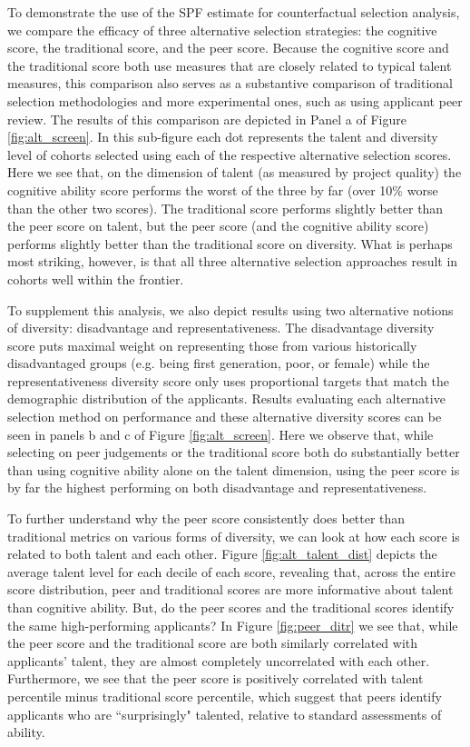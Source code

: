 To demonstrate the use of the SPF estimate for counterfactual selection analysis, we compare the efficacy of three alternative selection strategies: the cognitive score, the traditional score, and the peer score. Because the cognitive score and the traditional score both use measures that are closely related to typical talent measures, this comparison also serves as a substantive comparison of traditional selection methodologies and more experimental ones, such as using applicant peer review. The results of this comparison are depicted in Panel a of Figure \ref{fig:alt_screen}. In this sub-figure each dot represents the talent and diversity level of cohorts selected using each of the respective alternative selection scores. Here we see that, on the dimension of talent (as measured by project quality) the cognitive ability score performs the worst of the three by far (over 10\% worse than the other two scores). The traditional score performs slightly better than the peer score on talent, but the peer score (and the cognitive ability score) performs slightly better than the traditional score on diversity. What is perhaps most striking, however, is that all three alternative selection approaches result in cohorts well within the frontier.

To supplement this analysis, we also depict results using two alternative notions of diversity: disadvantage and representativeness. The disadvantage diversity score puts maximal weight on representing those from various historically disadvantaged groups (e.g. being first generation, poor, or female) while the representativeness diversity score only uses proportional targets that match the demographic distribution of the applicants. Results evaluating each alternative selection method on performance and these alternative diversity scores can be seen in panels b and c of Figure \ref{fig:alt_screen}. Here we observe that, while selecting on peer judgements or the traditional score both do substantially better than using cognitive ability alone on the talent dimension, using the peer score is by far the highest performing on both disadvantage and representativeness.

To further understand why the peer score consistently does better than traditional metrics on various forms of diversity, we can look at how each score is related to both talent and each other. Figure \ref{fig:alt_talent_dist} depicts the average talent level for each decile of each score, revealing that, across the entire score distribution, peer and traditional scores are more informative about talent than cognitive ability. But, do the peer scores and the traditional scores identify the same high-performing applicants? In Figure \ref{fig:peer_ditr} we see that, while the peer score and the traditional score are both similarly correlated with applicants' talent, they are almost completely uncorrelated with each other. Furthermore, we see that the peer score is positively correlated with talent percentile minus traditional score percentile, which suggest that peers identify applicants who are ``surprisingly" talented, relative to standard assessments of ability. 

